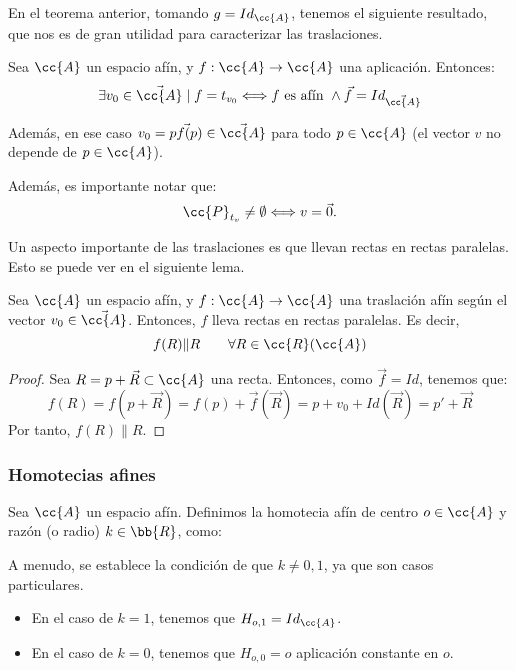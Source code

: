 En el teorema anterior, tomando $g=Id_{\cc{A}}$, tenemos el siguiente resultado, que nos es de gran utilidad para caracterizar las traslaciones.
\begin{coro}
    Sea $\cc{A}$ un espacio afín, y $f:\cc{A}\to \cc{A}$ una aplicación. Entonces:
    \begin{equation*}
        \exists v_0\in \vec{\cc{A}}\mid f=t_{v_0} \Longleftrightarrow f\text{ es afín }\land \vec{f}=Id_{\vec{\cc{A}}} 
    \end{equation*}

    Además, en ese caso $v_0=\vec{pf(p)}\in \vec{\cc{A}}$ para todo $p\in \cc{A}$ (el vector $v$ no depende de $p\in \cc{A}$).
\end{coro}

Además, es importante notar que:
\begin{equation*}
    \cc{P}_{t_v}\neq \emptyset \Longleftrightarrow v=\vec{0}.
\end{equation*}

Un aspecto importante de las traslaciones es que llevan rectas en rectas paralelas. Esto se puede ver en el siguiente lema.
\begin{lema}
    Sea $\cc{A}$ un espacio afín, y $f:\cc{A}\to \cc{A}$ una traslación afín según el vector $v_0\in \vec{\cc{A}}$. Entonces, $f$ lleva rectas en rectas paralelas. Es decir,
    \begin{equation*}
        f(R)\| R \qquad \forall R\in \cc{R}(\cc{A})
    \end{equation*}
\end{lema}
\begin{proof}
    Sea $R=p+\vec{R}\subset \cc{A}$ una recta. Entonces, como $\vec{f}=Id$, tenemos que:
    \begin{equation*}
        f(R) = f(p+\vec{R}) = f(p) + \vec{f}(\vec{R}) = p+v_0 + Id(\vec{R}) = p' + \vec{R}
    \end{equation*}
    Por tanto, $f(R)\| R$.
\end{proof}

\subsubsection{Homotecias afines}

\begin{definicion}
    Sea $\cc{A}$ un espacio afín. Definimos la homotecia afín de centro $o\in \cc{A}$ y razón (o radio) $k\in\bb{R}$, como:
\end{definicion}
\begin{observacion}
    A menudo, se establece la condición de que $k\neq 0,1$, ya que son casos particulares. \begin{itemize}
        \item En el caso de $k=1$, tenemos que $H_{o,1}=Id_{\cc{A}}$.
        \item En el caso de $k=0$, tenemos que $H_{o,0}=o$ aplicación constante en $o$.
    \end{itemize}
\end{observacion}

